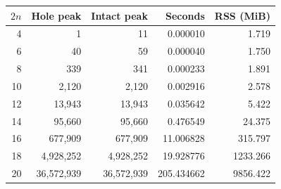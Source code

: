 \begin{tabular}{rrrrr}
\toprule
$2n$ & Hole peak & Intact peak & Seconds & RSS (MiB) \\
\midrule
4 & 1 & 11 & 0.000010 & 1.719 \\
6 & 40 & 59 & 0.000040 & 1.750 \\
8 & 339 & 341 & 0.000233 & 1.891 \\
10 & 2,120 & 2,120 & 0.002916 & 2.578 \\
12 & 13,943 & 13,943 & 0.035642 & 5.422 \\
14 & 95,660 & 95,660 & 0.476549 & 24.375 \\
16 & 677,909 & 677,909 & 11.006828 & 315.797 \\
18 & 4,928,252 & 4,928,252 & 19.928776 & 1233.266 \\
20 & 36,572,939 & 36,572,939 & 205.434662 & 9856.422 \\
\bottomrule
\end{tabular}
